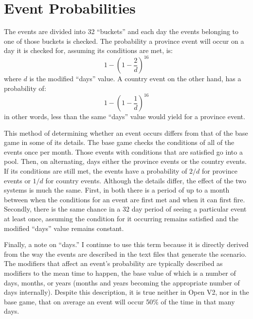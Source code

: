 \section{Event Probabilities}
The events are divided into 32 ``buckets'' and each day the events belonging to one of those buckets is checked. The probability a province event will occur on a day it is checked for, assuming its conditions are met, is:
	\[
	1 - \left( 1 - \frac{2}{d} \right)^{16}
\]
where \( d \) is the modified ``days'' value. A country event on the other hand, has a probability of:
\[
	1 - \left( 1 - \frac{1}{d} \right)^{16}
\]
in other words, less than the same ``days'' value would yield for a province event.

This method of determining whether an event occurs differs from that of the base game in some of its details. The base game checks the conditions of all of the events once per month. Those events with conditions that are satisfied go into a pool. Then, on alternating, days either the province events or the country events. If its conditions are still met, the events have a probability of \( 2/d \) for province events or \( 1/d \) for country events. Although the details differ, the effect of the two systems is much the same. First, in both there is a period of up to a month between when the conditions for an event are first met and when it can first fire. Secondly, there is the same chance in a 32 day period of seeing a particular event at least once, assuming the condition for it occurring remains satisfied and the modified ``days'' value remains constant.

Finally, a note on ``days.'' I continue to use this term because it is directly derived from the way the events are described in the text files that generate the scenario. The modifiers that affect an event's probability are typically described as modifiers to the mean time to happen, the base value of which is a number of days, months, or years (months and years becoming the appropriate number of days internally). Despite this description, it is true neither in Open V2, nor in the base game, that on average an event will occur 50\% of the time in that many days.
